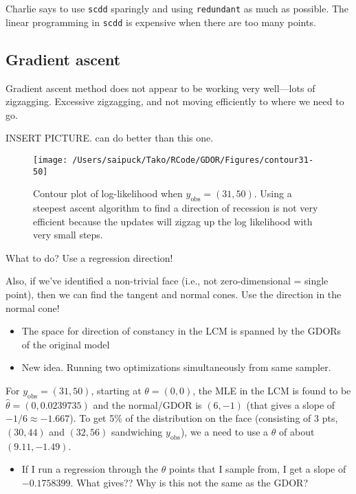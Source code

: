\documentclass{amsbook}
\newcommand{\yobs}{y_{\textrm{obs}}}
\theoremstyle{definition}
\theoremstyle{remark}
\begin{document}
Charlie says to use \texttt{scdd} sparingly and using \texttt{redundant} as much as possible.  The linear programming in \texttt{scdd} is expensive when there are too many points.

\subsection{Gradient ascent}
Gradient ascent method does not appear to be working very well---lots of zigzagging.  Excessive 
zigzagging, and not moving efficiently to where we need to go.  

INSERT PICTURE.  can do better than this one.
\begin{figure}[!h]
\centering
\texttt{[image: /Users/saipuck/Tako/RCode/GDOR/Figures/contour31-50]}
\caption{Contour plot of log-likelihood when $\yobs = (31, 50)$.  Using a steepest 
ascent algorithm to find a direction of recession is not very efficient because the 
updates will zigzag up the log likelihood with very small steps.}
\end{figure}

What to do?  Use a regression direction!

Also, if we've identified a non-trivial face (i.e., not zero-dimensional = single point), then we can find the tangent and normal cones.  Use the direction in the normal cone!

\begin{itemize}
\item The space for direction of constancy in the LCM is spanned by the GDORs of the 
original model
\item New idea.  Running two optimizations simultaneously from same sampler.
\end{itemize}

For $\yobs = 
(31,50)$, starting at $\theta = (0,0)$, the MLE in the LCM is found to be $\hat{\theta} 
= (0, 0.0239735)$ and the normal/GDOR is $(6, -1)$ (that gives a slope of $-1/6 \approx 
-1.667$).  To get 5\% of the distribution on the face (consisting of 3 pts, $(30,44)$ 
and $(32,56)$ sandwiching $\yobs$), we a need to use a $\theta$ of about $(9.11, 
-1.49)$.

\begin{itemize}
\item If I run a regression through the $\theta$ points that I sample from, I get a 
slope of $-0.1758399$.  What gives??  Why is this not the same as the GDOR?
\end{itemize}
\end{document}
